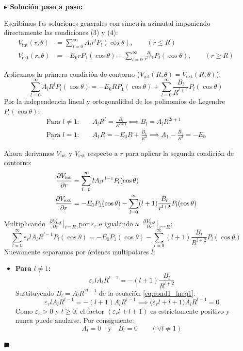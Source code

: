 \documentclass[11pt,a4paper]{book}
\newenvironment{solucion}{%
    \par\medskip\noindent\textbf{\color{blue!65!black}\Large $\blacktriangleright$ Solución paso a paso:}\par\medskip
}{%
    \hfill$\blacksquare$\par\bigskip
}
\begin{document}
\begin{solucion}
Escribimos las soluciones generales con simetría azimutal imponiendo directamente las condiciones (3) y (4):
\begin{align}
    V_{\text{int}}(r,\theta) &= \sum_{l=0}^{\infty} A_l r^l P_l(\cos\theta), \qquad (r \le R) \\
    V_{\text{ext}}(r,\theta) &= -E_0 r P_1(\cos\theta) + \sum_{l=0}^{\infty} \frac{B_l}{r^{l+1}} P_l(\cos\theta), \qquad (r \ge R)
\end{align}

Aplicamos la primera condición de contorno ($V_{\text{int}}(R,\theta) = V_{\text{ext}}(R,\theta)$):
\begin{equation}
    \sum_{l=0}^{\infty} A_l R^l P_l(\cos\theta) = -E_0 R P_1(\cos\theta) + \sum_{l=0}^{\infty} \frac{B_l}{R^{l+1}} P_l(\cos\theta)
\end{equation}
Por la independencia lineal y ortogonalidad de los polinomios de Legendre $P_l(\cos\theta)$:
\begin{align}
    \text{Para } l \neq 1: \quad & A_l R^l = \frac{B_l}{R^{l+1}} \implies B_l = A_l R^{2l+1} \label{eq:cond1_lneq1} \\
    \text{Para } l = 1: \quad & A_1 R = -E_0 R + \frac{B_1}{R^2} \implies A_1 - \frac{B_1}{R^3} = -E_0 \label{eq:cond1_leq1}
\end{align}

Ahora derivamos $V_{\text{int}}$ y $V_{\text{ext}}$ respecto a $r$ para aplicar la segunda condición de contorno:
\begin{align}
    \pdv{V_{\text{int}}}{r} &= \sum_{l=0}^{\infty} l A_l r^{l-1} P_l(\cos\theta) \\
    \pdv{V_{\text{ext}}}{r} &= -E_0 P_1(\cos\theta) - \sum_{l=0}^{\infty} (l+1)\frac{B_l}{r^{l+2}} P_l(\cos\theta)
\end{align}
Multiplicando $\left.\pdv{V_{\text{int}}}{r}\right|_{r=R}$ por $\varepsilon_r$ e igualando a $\left.\pdv{V_{\text{ext}}}{r}\right|_{r=R}$:
\begin{equation}
    \sum_{l=0}^{\infty} \varepsilon_r l A_l R^{l-1} P_l(\cos\theta) = -E_0 P_1(\cos\theta) - \sum_{l=0}^{\infty} (l+1)\frac{B_l}{R^{l+2}} P_l(\cos\theta)
\end{equation}
Nuevamente separamos por órdenes multipolares $l$:
\begin{itemize}
    \item \textbf{Para $l \neq 1$:}
    \begin{equation}
        \varepsilon_r l A_l R^{l-1} = -(l+1)\frac{B_l}{R^{l+2}}
    \end{equation}
    Sustituyendo $B_l = A_l R^{2l+1}$ de la ecuación \eqref{eq:cond1_lneq1}:
    \begin{equation}
        \varepsilon_r l A_l R^{l-1} = -(l+1) A_l R^{l-1} \implies \big(\varepsilon_r l + l + 1\big) A_l R^{l-1} = 0
    \end{equation}
    Como $\varepsilon_r > 0$ y $l \ge 0$, el factor $(\varepsilon_r l + l + 1)$ es estrictamente positivo y nunca puede anularse. Por consiguiente:
    \begin{equation}
        A_l = 0 \quad \text{y} \quad B_l = 0 \qquad (\forall l \neq 1)
    \end{equation}


\end{itemize}
\end{solucion}
\end{document}
